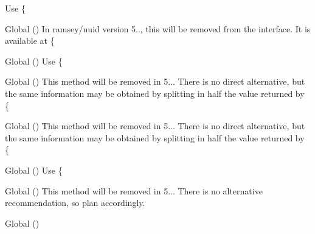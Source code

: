 \begin{DoxyRefList}
%
Use \{ 
\item[Global \doxylink{interface_ramsey_1_1_uuid_1_1_deprecated_uuid_interface_a80943d6026bc56930ebcf017ffcafd33}{Deprecated\+Uuid\+Interface\+::get\+Date\+Time} ()]\label{deprecated__deprecated000294}%
%
In ramsey/uuid version 5.., this will be removed from the interface. It is available at \{ 
\item[Global \doxylink{interface_ramsey_1_1_uuid_1_1_deprecated_uuid_interface_a0254b872eba5ed13abb62c8f544973f5}{Deprecated\+Uuid\+Interface\+::get\+Fields\+Hex} ()]\label{deprecated__deprecated000290}%
%
Use \{ 
\item[Global \doxylink{interface_ramsey_1_1_uuid_1_1_deprecated_uuid_interface_a9377d7086b7368a4b421dc3f0b72a8f6}{Deprecated\+Uuid\+Interface\+::get\+Least\+Significant\+Bits\+Hex} ()]\label{deprecated__deprecated000295}%
%
This method will be removed in 5... There is no direct alternative, but the same information may be obtained by splitting in half the value returned by \{ 
\item[Global \doxylink{interface_ramsey_1_1_uuid_1_1_deprecated_uuid_interface_a5b313cc7e08a0010445eee725a978284}{Deprecated\+Uuid\+Interface\+::get\+Most\+Significant\+Bits\+Hex} ()]\label{deprecated__deprecated000296}%
%
This method will be removed in 5... There is no direct alternative, but the same information may be obtained by splitting in half the value returned by \{ 
\item[Global \doxylink{interface_ramsey_1_1_uuid_1_1_deprecated_uuid_interface_a668b7447a6808eca31ab2d2281d11407}{Deprecated\+Uuid\+Interface\+::get\+Node\+Hex} ()]\label{deprecated__deprecated000297}%
%
Use \{ 
\item[Global \doxylink{interface_ramsey_1_1_uuid_1_1_deprecated_uuid_interface_ab9e4dd24ec789a7e2b54a34edf098d2d}{Deprecated\+Uuid\+Interface\+::get\+Number\+Converter} ()]\label{deprecated__deprecated000289}%
%
This method will be removed in 5... There is no alternative recommendation, so plan accordingly.  
\item[Global \doxylink{interface_ramsey_1_1_uuid_1_1_deprecated_uuid_interface_ab5839e600f3302bd00bb85f4640d4b4c}{Deprecated\+Uuid\+Interface\+::get\+Time\+Hi\+And\+Version\+Hex} ()]\label{deprecated__deprecated000298}%

\end{DoxyRefList}
